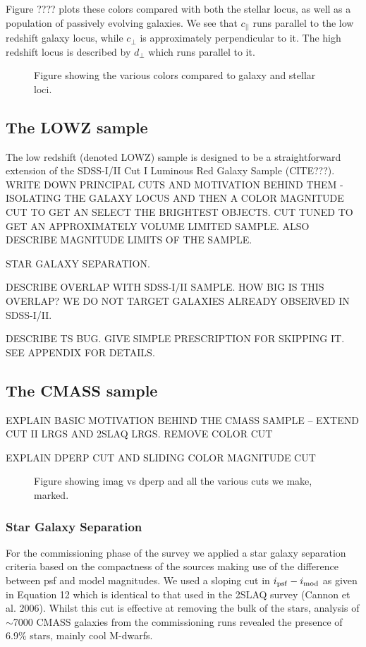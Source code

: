 \documentclass[preprint]{aastex}
\newcommand{\cpp}{c_{\perp}}
\newcommand{\cll}{c_{||}}
\newcommand{\dpp}{d_{\perp}}
\newcommand{\imod}{i_{\rm mod}}
\newcommand{\ipsf}{i_{\rm psf}}
\begin{document}
Figure ???? plots these colors compared with both the stellar locus,
as well as a population of passively evolving galaxies. We see that $\cll$ runs
parallel to the low redshift galaxy locus, while $\cpp$ is approximately
perpendicular to it. The high redshift locus is described by $\dpp$ which runs
parallel to it. 

\begin{figure}
\caption{Figure showing the various colors compared to galaxy and stellar loci.}
\label{fig:color}
\end{figure}

\subsection{The LOWZ sample}

The low redshift (denoted LOWZ) sample is designed to be a straightforward
extension of the SDSS-I/II Cut I Luminous Red Galaxy Sample (CITE???).
WRITE DOWN PRINCIPAL CUTS AND MOTIVATION BEHIND THEM - ISOLATING THE GALAXY
LOCUS AND THEN A COLOR MAGNITUDE CUT TO GET AN SELECT THE BRIGHTEST OBJECTS. 
CUT TUNED TO GET AN APPROXIMATELY VOLUME LIMITED SAMPLE. ALSO DESCRIBE MAGNITUDE
LIMITS OF THE SAMPLE.

STAR GALAXY SEPARATION.

DESCRIBE OVERLAP WITH SDSS-I/II SAMPLE. HOW BIG IS THIS OVERLAP? WE DO NOT
TARGET GALAXIES ALREADY OBSERVED IN SDSS-I/II.

DESCRIBE TS BUG. GIVE SIMPLE PRESCRIPTION FOR SKIPPING IT. SEE APPENDIX FOR
DETAILS.

\subsection{The CMASS sample}

EXPLAIN BASIC MOTIVATION BEHIND THE CMASS SAMPLE -- EXTEND CUT II LRGS AND 2SLAQ
LRGS. REMOVE COLOR CUT

EXPLAIN DPERP CUT AND SLIDING COLOR MAGNITUDE CUT

\begin{figure}
\caption{Figure showing imag vs dperp and all the various cuts we make, marked.}
\end{figure}

\subsubsection{Star Galaxy Separation}
For the commissioning phase of the survey we applied a star galaxy separation
criteria based on the compactness of the sources making use of the difference
between psf and model magnitudes. We used a sloping cut in  $\ipsf-\imod$ as
given in Equation 12 which is identical to that used in the 2SLAQ survey (Cannon
et al. 2006). Whilst this cut is effective at removing the bulk of the stars,
analysis of $\sim$7000 CMASS galaxies from the commissioning runs revealed the
presence of 6.9\% stars, mainly cool M-dwarfs.
\end{document}
